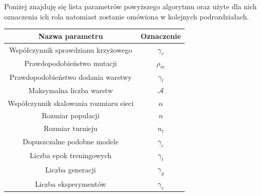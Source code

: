 \documentclass{article}
\begin{document}
Poniżej znajduję się lista parametrów powyższego algorytmu oraz użyte dla nich oznaczenia
ich rola natomiast zostanie omówiona w kolejnych podrozdziałach.\\
\begin{center}
\begin{tabular}{|c|c|}
	\hline
	Nazwa parametru & Oznaczenie \\
	\hline
	Współczynnik sprawdzianu krzyżowego & $\gamma_v$ \\
	Prawdopodobieństwo mutacji & $\rho_m$ \\
	Prawdopodobieństwo dodania warstwy & $\gamma_l$ \\
	Maksymalna liczba warstw & $\mathcal{A}$ \\
	Współczynnik skalowania rozmiaru sieci & $\alpha$ \\
	Rozmiar populacji & $n$ \\
	Rozmiar turnieju & $n_t$ \\
	Dopuszczalne podobne modele & $\gamma_c$\\
	Liczba epok treningowych & $\gamma_t$\\
	Liczba generacji & $\gamma_g$\\
	Liczba eksperymentów & $\gamma_r$\\
	\hline
\end{tabular}
\label{tab:ag}
\newline
\end{center}
\end{document}
